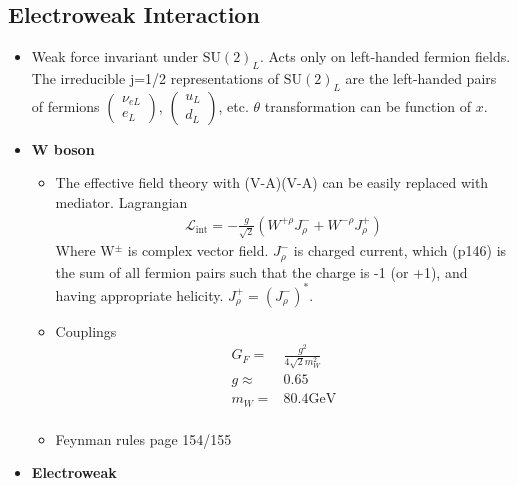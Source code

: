 \subsection{Electroweak Interaction}
\begin{itemize}
        \item Weak force invariant under $\text{SU}(2)_L$. Acts only on left-handed fermion fields. The irreducible j=1/2 representations of $\text{SU}(2)_L$ are the left-handed pairs of fermions $\begin{pmatrix}\nu_{eL}\\e_L\end{pmatrix}$, $\begin{pmatrix}u_L\\d_L\end{pmatrix}$, etc. $\theta$ transformation can be function of $x$. \cite{wells}
    \item \textbf{W boson} \cite{wells}
    \begin{itemize}
        \item The effective field theory with (V-A)(V-A) can be easily replaced with mediator.  Lagrangian \cite{wells}
        \begin{equation}\begin{split}
        \mathcal{L}_\text{int}=-\frac{g}{\sqrt{2}}(W^{+\rho}J^-_\rho+W^{-\rho}J^+_\rho)
        \end{split}\end{equation}
        Where W$^\pm$ is complex vector field. $J_\rho^-$ is charged current, which (p146) is the sum of all fermion pairs such that the charge is -1 (or +1), and having appropriate helicity. $J_\rho^+=(J_\rho^-)^*$.
        \item Couplings \cite{wells}
        \begin{equation}\begin{split}
        G_F=&\frac{g^2}{4\sqrt{2}m_W^2} \\
        g\approx&0.65\\
        m_W=&80.4\text{GeV}\\
        \end{split}\end{equation}
        \item {\color{red}Feynman rules page 154/155} \cite{wells}
    \end{itemize}
    \item \textbf{Electroweak} \cite{wells}
    \begin{itemize}

\end{itemize}
\end{itemize}

